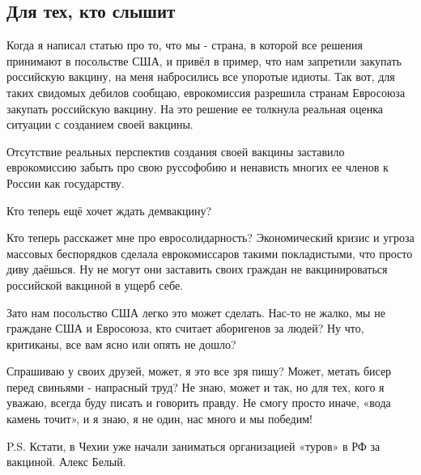  
 
 

\subsection{Для тех, кто слышит}

Когда я написал статью про то, что мы - страна, в которой все решения принимают
в посольстве США, и привёл в пример, что нам запретили закупать российскую
вакцину, на меня набросились все упоротые идиоты. Так вот, для таких свидомых
дебилов сообщаю, еврокомиссия разрешила странам Евросоюза  закупать российскую
вакцину. На это решение ее толкнула реальная оценка ситуации с созданием своей
вакцины. 

Отсутствие реальных перспектив создания своей вакцины заставило еврокомиссию
забыть про свою руссофобию и ненависть многих ее членов к России как
государству. 

Кто теперь ещё хочет ждать демвакцину? 

Кто теперь расскажет мне про  евросолидарность? Экономический кризис и угроза
массовых беспорядков сделала еврокомиссаров такими покладистыми, что просто
диву даёшься. Ну не могут они заставить своих граждан не вакцинироваться
российской вакциной в ущерб себе. 

Зато нам посольство США легко это может сделать. Нас-то не жалко, мы не
граждане США  и Евросоюза, кто считает аборигенов за людей? Ну что, критиканы,
все вам ясно или опять не дошло? 

Спрашиваю у своих друзей, может, я это все зря пишу? Может, метать бисер перед
свиньями - напрасный труд? Не знаю, может и так, но для тех, кого я уважаю,
всегда буду писать и говорить правду. Не смогу просто иначе, «вода камень
точит», и я знаю, я не один, нас много и мы победим!

P.S. Кстати, в Чехии уже начали заниматься организацией «туров» в РФ за
вакциной.  Алекс Белый.
